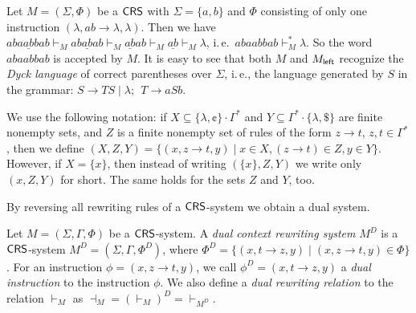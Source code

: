 \begin{example}\label{example:dyck}
Let $M = (\Sigma, \Phi)$ be a $\textup{\sf CRS\/}$ with $\Sigma = \{a, b\}$ and $\Phi$ consisting of only one instruction $(\lambda, ab \to \lambda, \lambda)$. Then we have $aba\underline{ab}bab \vdash_M ab\underline{ab}ab \vdash_M \underline{ab}ab \vdash_M \underline{ab} \vdash_M \lambda$, i.\,e.\ $abaabbab \vdash_M^* \lambda$. So the word $abaabbab$ is accepted by $M$. It is easy to see that both $M$ and $M_{\sf left}$ recognize the \emph{Dyck language} of correct parentheses over $\Sigma$, i.\,e., the language generated by $S$ in the grammar: $S \to TS \mid \lambda; \ \ T \to a S b$.
\end{example}

\begin{remark}\label{remark:setinstructions}
We use the following notation: if $X \subseteq \{\lambda, \cent\}\cdot\Gamma^*$ and $Y \subseteq \Gamma^*\cdot\{\lambda, \$\}$ are finite nonempty sets, and $Z$ is a finite nonempty set of rules of the form $z \to t$, $z, t \in \Gamma^*$, then we define $(X, Z, Y) = \{(x, z \to t, y) \mid x \in X, (z \to t) \in Z, y \in Y \}$. However, if $X = \{ x \}$, then instead of writing $( \{ x \}, Z, Y)$ we write only $(x, Z, Y)$ for short. The same holds for the sets $Z$ and $Y$, too.
\end{remark}

By reversing all rewriting rules of a $\textup{\sf CRS\/}$-system we obtain a dual system.

\begin{definition}\label{definition:crs-dual}
Let $M=(\Sigma, \Gamma, \Phi)$ be a $\textup{\sf CRS\/}$-system. A \emph{dual context rewriting system} $M^D$ is a $\textup{\sf CRS\/}$-system $M^D = (\Sigma, \Gamma, \Phi^D)$, where $\Phi^D = \{(x, t \to z, y) \mid (x, z \to t, y) \in \Phi \}$. For an instruction $\phi = (x, z \to t, y)$, we call $\phi^D = (x, t \to z, y)$ a \emph{dual instruction} to the instruction $\phi$. We also define a \emph{dual rewriting relation} to the relation $\vdash_M$ as $\dashv_M = (\vdash_M)^D = \vdash_{M^D}$.
\end{definition}

